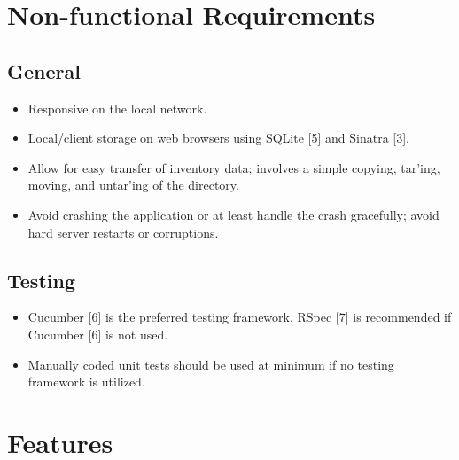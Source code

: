 \documentclass{article}
\begin{document}
\section{Non-functional Requirements}

\subsection{General}
\begin{itemize}
\item Responsive on the local network.
\item Local/client storage on web browsers using SQLite [5] and Sinatra [3].
\item Allow for easy transfer of inventory data; involves a simple copying, tar'ing, moving, and untar'ing of the directory.
\item Avoid crashing the application or at least handle the crash gracefully; avoid hard server restarts or corruptions.
\end{itemize}

\subsection{Testing}
\begin{itemize}
\item Cucumber [6] is the preferred testing framework. RSpec [7] is recommended if Cucumber [6] is not used.
\item Manually coded unit tests should be used at minimum if no testing framework is utilized.
\end{itemize}

\section{Features}
\end{document}
